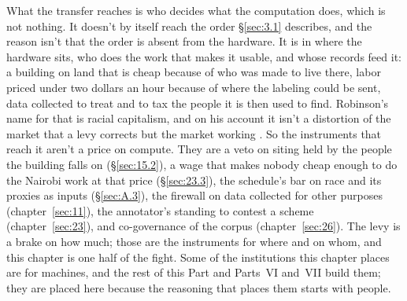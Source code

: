 What the transfer reaches is who decides what the computation does, which is not nothing. It doesn't by itself reach the order \S\ref{sec:3.1} describes, and the reason isn't that the order is absent from the hardware. It is in where the hardware sits, who does the work that makes it usable, and whose records feed it: a building on land that is cheap because of who was made to live there, labor priced under two dollars an hour because of where the labeling could be sent, data collected to treat and to tax the people it is then used to find. Robinson's name for that is racial capitalism, and on his account it isn't a distortion of the market that a levy corrects but the market working \autocite{robinson2000black,kelley2017racial}. So the instruments that reach it aren't a price on compute. They are a veto on siting held by the people the building falls on (\S\ref{sec:15.2}), a wage that makes nobody cheap enough to do the Nairobi work at that price (\S\ref{sec:23.3}), the schedule's bar on race and its proxies as inputs (\S\ref{sec:A.3}), the firewall on data collected for other purposes (chapter~\ref{sec:11}), the annotator's standing to contest a scheme (chapter~\ref{sec:23}), and co-governance of the corpus (chapter~\ref{sec:26}). The levy is a brake on how much; those are the instruments for where and on whom, and this chapter is one half of the fight. Some of the institutions this chapter places are for machines, and the rest of this Part and Parts~VI and~VII build them; they are placed here because the reasoning that places them starts with people.
